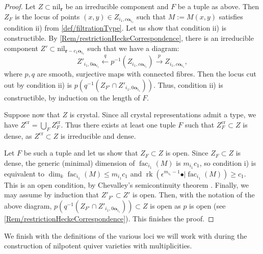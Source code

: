 \documentclass[a4paper,12pt]{article}
\theoremstyle{definition}
\theoremstyle{plain}
\theoremstyle{remark}
\DeclareMathOperator{\fac}{fac}
\DeclareMathOperator{\rk}{rk}
\newcommand\bfalpha{\bm{\alpha}}
\newcommand\bfr{\mathbf{r}}
\begin{document}
\begin{proof}
Let $Z\subset\mathrm{nil}_\bfr$ be an irreducible component and $F$ be a tuple as above. Then $Z_F$ is the locus of points $(x,y)\in Z_{i_1,c\bfalpha_{i_1}}$ such that $M:=M(x,y)$ satisfies condition ii) from \cref{def/filtrationType}.
Let us show that condition ii) is constructible. By \cref{Rem/restrictionHeckeCorrespondence}, there is an irreducible component $Z'\subset\mathrm{nil}_{\bfr-c_1\bfalpha_{i_1}}$ such that we have a diagram:
\[
Z'_{i_1,0\bfalpha_{i_1}}
\overset{q}{\longleftarrow}
p^{-1}(Z_{i_1,c\bfalpha_{i_1}})
\overset{p}{\longrightarrow}
Z_{i_1,c\bfalpha_{i_1}}
,
\]
where $p,q$ are smooth, surjective maps with connected fibres. Then the locus cut out by condition ii) is $p(q^{-1}(Z_{F'}\cap Z'_{i_1,0\bfalpha_{i_1}}))$. Thus, condition ii) is constructible, by induction on the length of $F$.

Suppose now that $Z$ is crystal. Since all crystal representations admit a type, we have $Z^\mathrm{cr}=\bigcup_FZ_F^\mathrm{cr}$. Thus there exists at least one tuple $F$ such that $Z_F^\mathrm{cr}\subset Z$ is dense, as $Z^\mathrm{cr}\subset Z$ is irreducible and dense.

Let $F$ be such a tuple and let us show that $Z_F\subset Z$ is open.
Since $Z_F\subset Z$ is dense, the generic (minimal) dimension of $\fac_{i_1}(M)$ is $m_{i_1}c_1$, so condition i) is equivalent to $\dim_k\fac_{i_1}(M)\leq m_{i_1}c_1$ and $\rk(\epsilon^{m_{i_1}-1}\bullet\vert\fac_{i_1}(M))\geq c_1$. This is an open condition, by Chevalley's semicontinuity theorem \cite[Thm.\ 13.1.3]{Gro66}. Finally, we may assume by induction that $Z'_{F'}\subset Z'$ is open. Then, with the notation of the above diagram, $p(q^{-1}(Z_{F'}\cap Z'_{i_1,0\bfalpha_{i_1}}))\subset Z$ is open as $p$ is open (see \cref{Rem/restrictionHeckeCorrespondence}). This finishes the proof.
\end{proof}

We finish with the definitions of the various loci we will work with during the construction of nilpotent quiver varieties with multiplicities.
\end{document}
